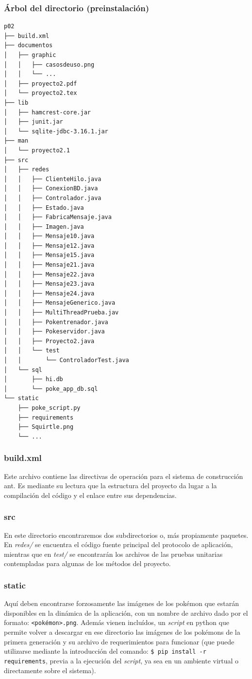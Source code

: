 \documentclass[12pt]{article}
\begin{document}
\subsubsection{Árbol del directorio (preinstalación)}
\begin{verbatim}
p02
├── build.xml
├── documentos
│   ├── graphic
│   │   ├── casosdeuso.png
│   │   └── ...
│   ├── proyecto2.pdf
│   └── proyecto2.tex
├── lib
│   ├── hamcrest-core.jar
│   ├── junit.jar
│   └── sqlite-jdbc-3.16.1.jar
├── man
│   └── proyecto2.1
├── src
│   ├── redes
│   │   ├── ClienteHilo.java
│   │   ├── ConexionBD.java
│   │   ├── Controlador.java
│   │   ├── Estado.java
│   │   ├── FabricaMensaje.java
│   │   ├── Imagen.java
│   │   ├── Mensaje10.java
│   │   ├── Mensaje12.java
│   │   ├── Mensaje15.java
│   │   ├── Mensaje21.java
│   │   ├── Mensaje22.java
│   │   ├── Mensaje23.java
│   │   ├── Mensaje24.java
│   │   ├── MensajeGenerico.java
│   │   ├── MultiThreadPrueba.jav
│   │   ├── Pokentrenador.java
│   │   ├── Pokeservidor.java
│   │   ├── Proyecto2.java
│   │   └── test
│   │       └── ControladorTest.java
│   └── sql
│       ├── hi.db
│       └── poke_app_db.sql
└── static
    ├── poke_script.py
    ├── requirements
    ├── Squirtle.png
    └── ...

\end{verbatim}
\subsubsection{build.xml}
Este archivo contiene las directivas de operación para el sistema de construcción ant. Es mediante
su lectura que la estructura del proyecto da lugar a la compilación del código y el enlace entre sus
dependencias.
\subsubsection{src}
En este directorio encontraremos dos subdirectorios o, más propiamente paquetes. En \textit{redes/} se encuentra el código fuente principal del protocolo de aplicación, mientras que en \textit{test/} se encontrarán los archivos de las pruebas unitarias contempladas para algunas de los métodos del proyecto. 
\subsubsection{static}
Aquí deben encontrarse forzosamente las imágenes de los pokémon que estarán disponibles en la dinámica de la aplicación, con un nombre de archivo dado por el formato: \texttt{<pokémon>.png}. Además vienen incluídos, un \textit{script} en python que permite volver a descargar en ese directorio las imágenes de los pokémons de la primera generación y su archivo de requerimientos para funcionar (que puede utilizarse mediante la introducción del comando: \texttt{\$ pip install -r requirements}, previa a la ejecución del \textit{script}, ya sea en un ambiente virtual o directamente sobre el sistema). 
\end{document}
